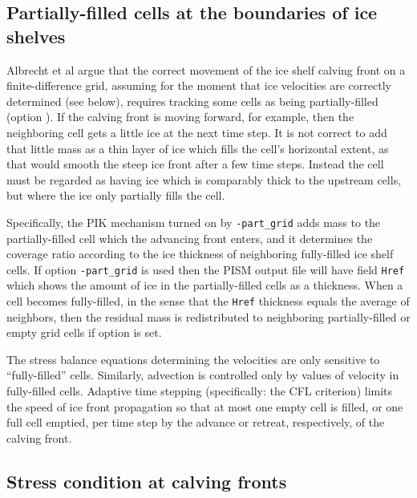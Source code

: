 \subsection{Partially-filled cells at the boundaries of ice shelves}
\label{sec:part-grid}

Albrecht et al \cite{Albrechtetal2011} argue that the correct movement of the ice shelf calving front on a finite-difference grid, assuming for the moment that ice velocities are correctly determined (see below), requires tracking some cells as being partially-filled (option ).  If the calving front is moving forward, for example, then the neighboring cell gets a little ice at the next time step.  It is not correct to add that little mass as a thin layer of ice which fills the cell's horizontal extent, as that would smooth the steep ice front after a few time steps.  Instead the cell must be regarded as having ice which is comparably thick to the upstream cells, but where the ice only partially fills the cell.

Specifically, the PIK mechanism turned on by \texttt{-part_grid} adds mass to the partially-filled cell which the advancing front enters, and it determines the coverage ratio according to the ice thickness of neighboring fully-filled ice shelf cells.  If option \texttt{-part_grid} is used then the PISM output file will have field \texttt{Href} which shows the amount of ice in the partially-filled cells as a thickness.  When a cell becomes fully-filled, in the sense that the \texttt{Href} thickness equals the average of neighbors, then the residual mass is redistributed to neighboring partially-filled or empty grid cells if option  is set.

The stress balance equations determining the velocities are only sensitive to ``fully-filled'' cells.  Similarly, advection is controlled only by values of velocity in fully-filled cells.  Adaptive time stepping (specifically: the CFL criterion) limits the speed of ice front propagation so that at most one empty cell is filled, or one full cell emptied, per time step by the advance or retreat, respectively, of the calving front.

\subsection{Stress condition at calving fronts}
\label{sec:cfbc}

